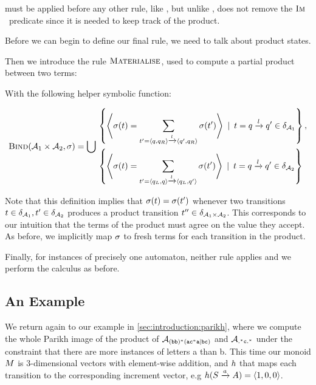 \documentclass[acmsmall,review,anonymous,screen]{acmart}\settopmatter{printfolios=true,printccs=true,printacmref=true}
\theoremstyle{definition}
\begin{document}
\ExpandM{} must be applied before any other rule, like \Expand{}, but unlike \Expand{}, \ExpandM{} does not remove the $\operatorname{\textsc{Im}}$~predicate since it is needed to keep track of the product.

Before we can begin to define our final rule, we need to talk about product states.

Then we introduce the rule $\textsc{Materialise}$, used to compute a partial product between two terms:

  With the following helper symbolic function:

  $$
  \textsc{Bind}(\mathcal{A}_1 \times \mathcal{A}_2, \operatorname{\sigma}) = \bigcup
  \begin{aligned}
  & \left\{ 
    \left<\operatorname{\sigma}(t)  =  \sum\limits_{t' = \left\langle q, q_R\right\rangle \xrightarrow{l} \left\langle q', q_R\right\rangle} \operatorname{\sigma}(t')\right>
  \:\mid\: t = q \xrightarrow{l} q' \in \delta_{\mathcal{A}_1} \right\} , \\ 
  & \left\{
    \left<\operatorname{\sigma}(t)  =  \sum\limits_{t' = \left\langle q_L, q\right\rangle \xrightarrow{l} \left\langle q_L, q'\right\rangle} \operatorname{\sigma}(t')\right> \:\mid\: t = q \xrightarrow{l} q' \in \delta_{\mathcal{A}_2}
  \right\}
  \end{aligned}
$$

Note that this definition implies that $\operatorname{\sigma}(t) =
\operatorname{\sigma}(t')$ whenever two transitions $t \in
\delta_{\mathcal{A}_1}, t' \in \delta_{\mathcal{A}_2}$
produces a product transition $t'' \in \delta_{\mathcal{A}_1
\times \mathcal{A}_2}$. This corresponds to our intuition that the terms of the
product must agree on the value they accept. As before, we implicitly map
$\operatorname{\sigma}$ to fresh terms for each transition in the product.

Finally, for instances of precisely one automaton, neither rule applies and we
perform the calculus as before.

\subsection{An Example}\label{sec:multiple:example}

We return again to our example in \cref{sec:introduction:parikh}, where we
compute the whole Parikh image of the product of $\mathcal{A}_{\mathtt{(bb)^\ast(ac^\ast{}a|bc)}}{}$ and
$\mathcal{A}_{\mathtt{.^\ast{}c.^\ast}}$ under the constraint that there are more instances of
letters a than b. This time our monoid $M$ is 3-dimensional vectors with
element-wise addition, and $h$ that maps each transition to the corresponding
increment vector, e.g $h(S \xrightarrow{a} A) = \left\langle1,0,0\right\rangle$.
\end{document}
